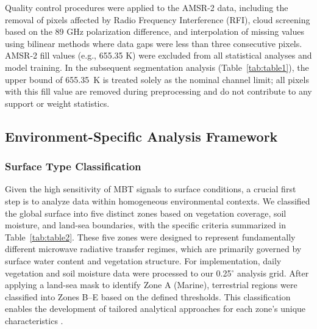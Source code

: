 \documentclass[preprint,review,12pt,authoryear]{elsarticle}
\begin{document}
Quality control procedures were applied to the AMSR-2 data, including the removal of pixels affected by Radio Frequency Interference (RFI), cloud screening based on the 89 GHz polarization difference, and interpolation of missing values using bilinear methods where data gaps were less than three consecutive pixels. AMSR-2 fill values (e.g., 655.35 K) were excluded from all statistical analyses and model training. In the subsequent segmentation analysis (Table~\ref{tab:table1}), the upper bound of 655.35~K is treated solely as the nominal channel limit; all pixels with this fill value are removed during preprocessing and do not contribute to any support or weight statistics.

\subsection{Environment-Specific Analysis Framework}\label{sec:env_framework}

\subsubsection{Surface Type Classification}\label{sec:surface_classification}
Given the high sensitivity of MBT signals to surface conditions, a crucial first step is to analyze data within homogeneous environmental contexts. We classified the global surface into five distinct zones based on vegetation coverage, soil moisture, and land-sea boundaries, with the specific criteria summarized in Table~\ref{tab:table2}. These five zones were designed to represent fundamentally different microwave radiative transfer regimes, which are primarily governed by surface water content and vegetation structure. For implementation, daily vegetation and soil moisture data were processed to our 0.25$^{\circ}$ analysis grid. After applying a land-sea mask to identify Zone A (Marine), terrestrial regions were classified into Zones B--E based on the defined thresholds. This classification enables the development of tailored analytical approaches for each zone's unique characteristics \citep{oweMethodologySurfaceSoil2001}.
\end{document}

